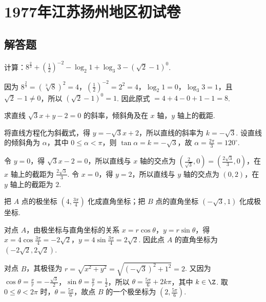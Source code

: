 \chapter{1977年江苏扬州地区初试卷}

\section{解答题}

\begin{problem}
计算：\(8^{\frac{2}{3}}+\left(\frac{1}{2}\right)^{-2}-\log_{2}1+\log_{3}3-\left(\sqrt{2}-1\right)^{0}\).
\end{problem}

\begin{solution}
因为 \(8^{\frac{2}{3}}=\left(\sqrt[3]{8}\right)^2=4\)，\(\left(\frac{1}{2}\right)^{-2}=2^2=4\)，\(\log_{2}1=0\)，\(\log_{3}3=1\)，且 \(\sqrt{2}-1\neq0\)，所以 \(\left(\sqrt{2}-1\right)^0=1\). 因此原式 \(=4+4-0+1-1=8\).
\end{solution}

\begin{problem}
求直线 \(\sqrt{3}x+y-2=0\) 的斜率，倾斜角及在 \(x\) 轴，\(y\) 轴上的截距.
\end{problem}

\begin{solution}
将直线方程化为斜截式，得 \(y=-\sqrt{3}x+2\)，所以直线的斜率为 \(k=-\sqrt{3}\). 设直线的倾斜角为 \(\alpha\)，其中 \(0\leqslant\alpha<\pi\)，则 \(\tan\alpha=k=-\sqrt{3}\)，故 \(\alpha=\frac{2\pi}{3}=120^\circ\).

令 \(y=0\)，得 \(\sqrt{3}x-2=0\)，所以直线与 \(x\) 轴的交点为 \(\left(\frac{2}{\sqrt{3}},0\right)=\left(\frac{2\sqrt{3}}{3},0\right)\)，在 \(x\) 轴上的截距为 \(\frac{2\sqrt{3}}{3}\). 令 \(x=0\)，得 \(y=2\)，所以直线与 \(y\) 轴的交点为 \(\left(0,2\right)\)，在 \(y\) 轴上的截距为 \(2\).
\end{solution}

\begin{problem}
把 \(A\) 点的极坐标 \(\left(4,\frac{3\pi}{4}\right)\) 化成直角坐标；把 \(B\) 点的直角坐标 \(\left(-\sqrt{3},1\right)\) 化成极坐标.
\end{problem}

\begin{solution}
对点 \(A\)，由极坐标与直角坐标的关系 \(x=r\cos\theta\)，\(y=r\sin\theta\)，得 \(x=4\cos\frac{3\pi}{4}=-2\sqrt{2}\)，\(y=4\sin\frac{3\pi}{4}=2\sqrt{2}\). 因此点 \(A\) 的直角坐标为 \(\left(-2\sqrt{2},2\sqrt{2}\right)\).

对点 \(B\)，其极径为 \(r=\sqrt{x^2+y^2}=\sqrt{\left(-\sqrt{3}\right)^2+1^2}=2\). 又因为 \(\cos\theta=\frac{x}{r}=-\frac{\sqrt{3}}{2}\)，\(\sin\theta=\frac{y}{r}=\frac{1}{2}\)，所以 \(\theta=\frac{5\pi}{6}+2k\pi\)，其中 \(k\in\Z\). 取 \(0\leqslant\theta<2\pi\) 时，\(\theta=\frac{5\pi}{6}\)，故点 \(B\) 的一个极坐标为 \(\left(2,\frac{5\pi}{6}\right)\).
\end{solution}

